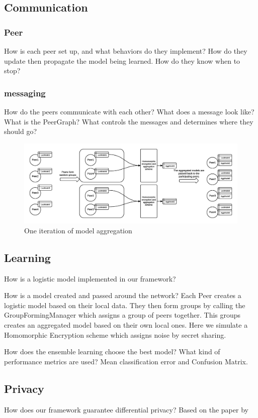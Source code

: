 \subsection{Communication}
\subsubsection{Peer}
How is each peer set up, and what behaviors do they implement? 
How do they update then propagate the model being learned.
How do they know when to stop?
\subsubsection{messaging}
How do the peers communicate with each other?
What does a message look like?
What is the PeerGraph?
What controls the messages and determines where they should go?
\begin{figure}[h!]
	\centering
	\includegraphics[width=\textwidth]{fig/peerModelCreation}
	\caption{One iteration of model aggregation}
	\label{fig:peerAggregationFigure}
\end{figure}


\subsection{Learning}
How is a logistic model implemented in our framework?

How is a model created and passed around the network?
Each Peer creates a logistic model based on their local data. They then form groups by calling the GroupFormingManager which assigns a group of peers together. This groups creates an aggregated model based on their own local ones. Here we simulate a Homomorphic Encryption scheme which assigns noise by secret sharing. 


How does the ensemble learning choose the best model?
What kind of performance metrics are used?
Mean classification error and Confusion Matrix.

\subsection{Privacy}
How does our framework guarantee differential privacy?
Based on the paper by 

